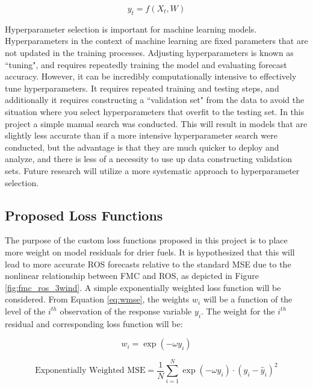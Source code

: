 \documentclass[11pt]{article}%
\begin{document}
\[
y_t = f(X_t, W)
\]

Hyperparameter selection is important for machine learning models. Hyperparameters in the context of machine learning are fixed parameters that are not updated in the training processes. Adjusting hyperparameters is known as ``tuning", and requires repeatedly training the model and evaluating forecast accuracy. However, it can be incredibly computationally intensive to effectively tune hyperparameters. It requires repeated training and testing steps, and additionally it requires constructing a ``validation set" from the data to avoid the situation where you select hyperparameters that overfit to the testing set. In this project a simple manual search was conducted. This will result in models that are slightly less accurate than if a more intensive hyperparameter search were conducted, but the advantage is that they are much quicker to deploy and analyze, and there is less of a necessity to use up data constructing validation sets. Future research will utilize a more systematic approach to hyperparameter selection. 

\subsection{Proposed Loss Functions}

The purpose of the custom loss functions proposed in this project is to place more weight on model residuals for drier fuels. It is hypothesized that this will lead to more accurate ROS forecasts relative to the standard MSE due to the nonlinear relationship between FMC and ROS, as depicted in Figure \ref{fig:fmc_ros_3wind}. A simple exponentially weighted loss function will be considered. From Equation \ref{eq:wmse}, the weights $w_i$ will be a function of the level of the $i^{th}$ observation of the response variable $y_i$. The weight for the $i^{th}$ residual and corresponding loss function will be:

\begin{equation}
    \label{eq:weights}
    w_i = \exp(-\omega y_i)
\end{equation}

\begin{equation}
    \label{eq:wloss}
    \text{Exponentially Weighted MSE} = \frac{1}{N}\sum_{i=1}^N \exp(-\omega y_i)\cdot (y_i - \hat y_i)^2
\end{equation}
\end{document}
